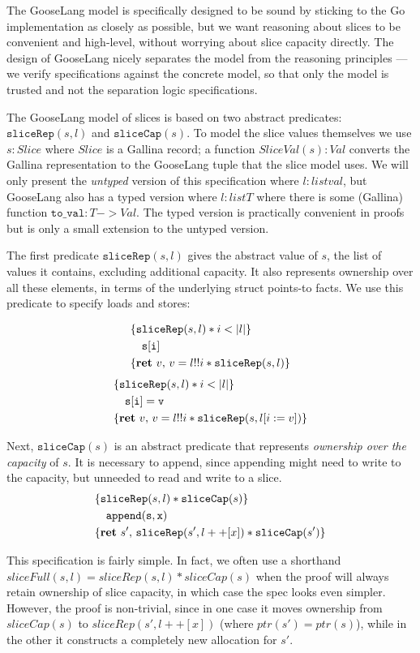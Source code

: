 The GooseLang model is specifically designed to be sound by sticking to
the Go implementation as closely as possible, but we want reasoning
about slices to be convenient and high-level, without worrying about
slice capacity directly. The design of GooseLang nicely separates the
model from the reasoning principles --- we verify specifications against
the concrete model, so that only the model is trusted and not the
separation logic specifications.

\newcommand{\sliceRep}{\mathtt{sliceRep}}
\newcommand{\sliceCap}{\mathtt{sliceCap}}

The GooseLang model of slices is based on two abstract predicates:
$\sliceRep(s, l)$ and $\sliceCap(s)$. To model the slice values
themselves we use $s : Slice$ where $Slice$ is a Gallina record; a
function $SliceVal(s) : Val$ converts the Gallina representation to
the GooseLang tuple that the slice model uses. We will only present the
\emph{untyped} version of this specification where $l : list val$, but
GooseLang also has a typed version where $l : list T$ where there is
some (Gallina) function $\mathtt{to\_val} : T -> Val$. The typed version is
practically convenient in proofs but is only a small extension to the
untyped version.

The first predicate $\sliceRep(s, l)$ gives the abstract value of
$s$, the list of values it contains, excluding additional capacity. It
also represents ownership over all these elements, in terms of the
underlying struct points-to facts. We use this predicate to specify
loads and stores:

\[
  \hoareV{\sliceRep(s, l) * i < |l|}%
{\mathtt{s[i]}}%
{\Ret{v} v = l !! i * \sliceRep(s, l)}
\]
\[
  \hoareV{\sliceRep(s, l) * i < |l|}%
 {\mathtt{s[i] = v}}%
{\Ret{v} v = l !! i * \sliceRep(s, l[i := v])}
\]

Next, $\sliceCap(s)$ is an abstract predicate that represents
\emph{ownership over the capacity} of $s$. It is necessary to append,
since appending might need to write to the capacity, but unneeded to
read and write to a slice.
\[
\hoareV{\sliceRep(s, l) * \sliceCap(s)}%
{\mathtt{append(s, x)}}%
{\Ret{s'} \sliceRep(s', l ++ [x]) * \sliceCap(s')}
\]

This specification is fairly simple. In fact, we often use a shorthand
$sliceFull(s, l) = sliceRep(s, l) * sliceCap(s)$ when the proof will
always retain ownership of slice capacity, in which case the spec looks
even simpler. However, the proof is non-trivial, since in one case it
moves ownership from $sliceCap(s)$ to $sliceRep(s', l ++ [x])$
(where $ptr(s') = ptr(s)$), while in the other it constructs a
completely new allocation for $s'$.

